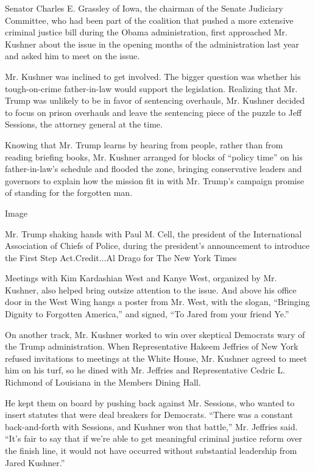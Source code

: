 Senator Charles E. Grassley of Iowa, the chairman of the Senate
Judiciary Committee, who had been part of the coalition that pushed a
more extensive criminal justice bill during the Obama administration,
first approached Mr. Kushner about the issue in the opening months of
the administration last year and asked him to meet on the issue.

Mr. Kushner was inclined to get involved. The bigger question was
whether his tough-on-crime father-in-law would support the legislation.
Realizing that Mr. Trump was unlikely to be in favor of sentencing
overhauls, Mr. Kushner decided to focus on prison overhauls and leave
the sentencing piece of the puzzle to Jeff Sessions, the attorney
general at the time.

Knowing that Mr. Trump learns by hearing from people, rather than from
reading briefing books, Mr. Kushner arranged for blocks of ``policy
time'' on his father-in-law's schedule and flooded the zone, bringing
conservative leaders and governors to explain how the mission fit in
with Mr. Trump's campaign promise of standing for the forgotten man.

Image

Mr. Trump shaking hands with Paul M. Cell, the president of the
International Association of Chiefs of Police, during the president's
announcement to introduce the First Step Act.Credit...Al Drago for The
New York Times

Meetings with Kim Kardashian West and Kanye West, organized by Mr.
Kushner, also helped bring outsize attention to the issue. And above his
office door in the West Wing hangs a poster from Mr. West, with the
slogan, ``Bringing Dignity to Forgotten America,'' and signed, ``To
Jared from your friend Ye.''

On another track, Mr. Kushner worked to win over skeptical Democrats
wary of the Trump administration. When Representative Hakeem Jeffries of
New York refused invitations to meetings at the White House, Mr. Kushner
agreed to meet him on his turf, so he dined with Mr. Jeffries and
Representative Cedric L. Richmond of Louisiana in the Members Dining
Hall.

He kept them on board by pushing back against Mr. Sessions, who wanted
to insert statutes that were deal breakers for Democrats. ``There was a
constant back-and-forth with Sessions, and Kushner won that battle,''
Mr. Jeffries said. ``It's fair to say that if we're able to get
meaningful criminal justice reform over the finish line, it would not
have occurred without substantial leadership from Jared Kushner.''


